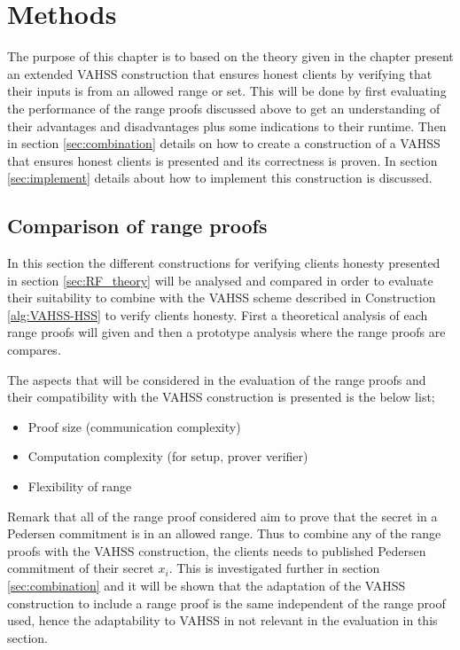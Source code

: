 \chapter{Methods}
\label{ch:Methods}

The purpose of this chapter is to based on the theory given in the chapter present an extended VAHSS construction that ensures honest clients by verifying that their inputs is from an allowed range or set. This will be done by first evaluating the performance of the range proofs discussed above to get an understanding of their advantages and disadvantages plus some indications to their runtime. Then in section \ref{sec:combination} details on how to create a construction of a VAHSS that ensures honest clients is presented and its correctness is proven. In section \ref{sec:implement} details about how to implement this construction is discussed. 

\section{Comparison of range proofs}
In this section the different constructions for verifying clients honesty presented in section \ref{sec:RF_theory} will be analysed and compared in order to evaluate  their suitability to combine with the VAHSS scheme described in Construction \ref{alg:VAHSS-HSS} to verify clients honesty. First a theoretical analysis of each range proofs will given and then a prototype analysis where the range proofs are compares.  

The aspects that will be considered in the evaluation of the range proofs and their compatibility with the VAHSS construction is presented is the below list;
\begin{itemize}
    \item Proof size (communication complexity)
    \item Computation complexity  (for setup, prover verifier)
    \item Flexibility of range
\end{itemize}

Remark that all of the range proof considered aim to prove that the secret in a Pedersen commitment is in an allowed range. Thus to combine any of the range proofs with the VAHSS construction, the clients needs to published Pedersen commitment of their secret $x_i$. This is investigated further in section \ref{sec:combination} and it will be shown that the adaptation of the VAHSS construction to include a range proof is the same independent of the range proof used, hence the adaptability to VAHSS in not relevant in the evaluation in this section.

